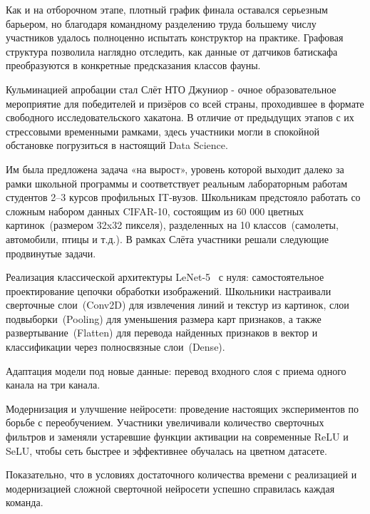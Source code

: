 \documentclass{report}
\begin{document}
Как и на отборочном этапе, плотный график финала оставался серьезным барьером, но благодаря командному разделению труда большему числу участников удалось полноценно испытать конструктор на практике. Графовая структура позволила наглядно отследить, как данные от датчиков батискафа преобразуются в конкретные предсказания классов фауны.


Кульминацией апробации стал Слёт НТО Джуниор - очное образовательное мероприятие для победителей и призёров со всей страны, проходившее в формате свободного исследовательского хакатона. В отличие от предыдущих этапов с их стрессовыми временными рамками, здесь участники могли в спокойной обстановке погрузиться в настоящий Data Science.


Им была предложена задача «на вырост», уровень которой выходит далеко за рамки школьной программы и соответствует реальным лабораторным работам студентов 2–3 курсов профильных IT-вузов. Школьникам предстояло работать со сложным набором данных CIFAR-10, состоящим из 60 000 цветных картинок~(размером 32x32 пикселя), разделенных на 10 классов~(самолеты, автомобили, птицы и т.д.). В рамках Слёта участники решали следующие продвинутые задачи.

\begin{enummarker}
\item Реализация классической архитектуры LeNet-5~\cite{bib_lenet_5} с нуля: самостоятельное проектирование цепочки обработки изображений. Школьники настраивали сверточные слои~(Conv2D) для извлечения линий и текстур из картинок, слои подвыборки~(Pooling) для уменьшения размера карт признаков, а также развертывание~(Flatten) для перевода найденных признаков в вектор и классификации через полносвязные слои~(Dense).
\item Адаптация модели под новые данные: перевод входного слоя с приема одного канала на три канала.
\item Модернизация и улучшение нейросети: проведение настоящих экспериментов по борьбе с переобучением. Участники увеличивали количество сверточных фильтров и заменяли устаревшие функции активации на современные ReLU и SeLU, чтобы сеть быстрее и эффективнее обучалась на цветном датасете.
\end{enummarker}

Показательно, что в условиях достаточного количества времени с реализацией и модернизацией сложной сверточной нейросети успешно справилась каждая команда.
\end{document}
